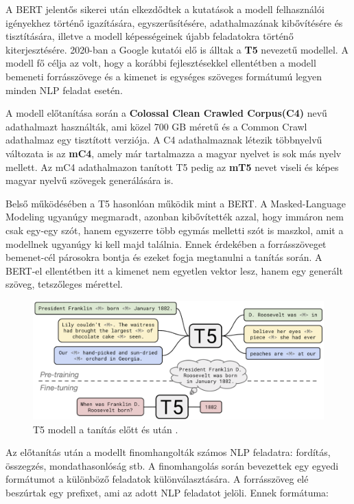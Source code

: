 
A BERT jelentős sikerei után elkezdődtek a kutatások a modell felhasználói igényekhez történő igazítására, egyszerűsítésére, adathalmazának kibővítésére és tisztítására, illetve a modell képességeinek újabb feladatokra történő kiterjesztésére. 2020-ban a Google kutatói elő is álltak a \textbf{T5} nevezetű modellel. A modell fő célja az volt, hogy a korábbi fejlesztésekkel ellentétben a modell bemeneti forrásszövege és a kimenet is egységes szöveges formátumú legyen minden NLP feladat esetén.

A modell előtanítása során a \textbf{Colossal Clean Crawled Corpus(C4)} nevű adathalmazt használták, ami közel 700 GB méretű és a  Common Crawl adathalmaz egy tisztított verziója. A C4 adathalmaznak létezik többnyelvű változata is az \textbf{mC4}, amely már tartalmazza a magyar nyelvet is sok más nyelv mellett. Az mC4 adathalmazon tanított T5 pedig az \textbf{mT5} nevet viseli és képes magyar nyelvű szövegek generálására is.

Belső működésében a T5 hasonlóan működik mint a BERT. A Masked-Language Modeling ugyanúgy megmaradt, azonban kibővítették azzal, hogy immáron nem csak egy-egy szót, hanem egyszerre több egymás melletti szót is maszkol, amit a modellnek ugyanúgy ki kell majd találnia. Ennek érdekében a forrásszöveget bemenet-cél párosokra bontja és ezeket fogja megtanulni a tanítás során. A BERT-el ellentétben itt a kimenet nem egyetlen vektor lesz, hanem egy generált szöveg, tetszőleges mérettel.

\begin{figure}[h]
\centering
\includegraphics[scale=0.2]{images/t5.png}
\caption{T5 modell a tanítás előtt és után \cite{t5}.}
\label{fig:t5}
\end{figure}

Az előtanítás után a modellt finomhangolták számos NLP feladatra: fordítás,\\
összegzés, mondathasonlóság stb. A finomhangolás során bevezettek egy egyedi formátumot a különböző feladatok különválasztására. A forrásszöveg elé beszúrtak egy prefixet, ami az adott NLP feladatot jelöli. Ennek formátuma:

